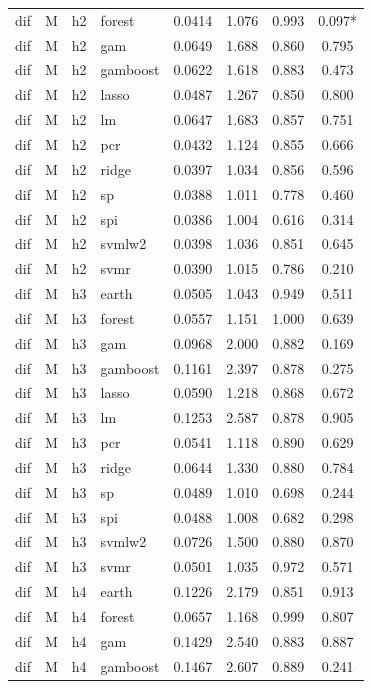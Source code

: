 \begin{ThreePartTable}
\begin{longtable}[t]{llclcccc}
dif & M & h2 & forest & 0.0414 & 1.076 & 0.993 & 0.097*\\
dif & M & h2 & gam & 0.0649 & 1.688 & 0.860 & 0.795\\
dif & M & h2 & gamboost & 0.0622 & 1.618 & 0.883 & 0.473\\
dif & M & h2 & lasso & 0.0487 & 1.267 & 0.850 & 0.800\\
dif & M & h2 & lm & 0.0647 & 1.683 & 0.857 & 0.751\\
dif & M & h2 & pcr & 0.0432 & 1.124 & 0.855 & 0.666\\
dif & M & h2 & ridge & 0.0397 & 1.034 & 0.856 & 0.596\\
dif & M & h2 & sp & 0.0388 & 1.011 & 0.778 & 0.460\\
dif & M & h2 & spi & 0.0386 & 1.004 & 0.616 & 0.314\\
dif & M & h2 & svmlw2 & 0.0398 & 1.036 & 0.851 & 0.645\\
dif & M & h2 & svmr & 0.0390 & 1.015 & 0.786 & 0.210\\
\addlinespace
dif & M & h3 & earth & 0.0505 & 1.043 & 0.949 & 0.511\\
dif & M & h3 & forest & 0.0557 & 1.151 & 1.000 & 0.639\\
dif & M & h3 & gam & 0.0968 & 2.000 & 0.882 & 0.169\\
dif & M & h3 & gamboost & 0.1161 & 2.397 & 0.878 & 0.275\\
dif & M & h3 & lasso & 0.0590 & 1.218 & 0.868 & 0.672\\
dif & M & h3 & lm & 0.1253 & 2.587 & 0.878 & 0.905\\
dif & M & h3 & pcr & 0.0541 & 1.118 & 0.890 & 0.629\\
dif & M & h3 & ridge & 0.0644 & 1.330 & 0.880 & 0.784\\
dif & M & h3 & sp & 0.0489 & 1.010 & 0.698 & 0.244\\
dif & M & h3 & spi & 0.0488 & 1.008 & 0.682 & 0.298\\
dif & M & h3 & svmlw2 & 0.0726 & 1.500 & 0.880 & 0.870\\
dif & M & h3 & svmr & 0.0501 & 1.035 & 0.972 & 0.571\\
\addlinespace
dif & M & h4 & earth & 0.1226 & 2.179 & 0.851 & 0.913\\
dif & M & h4 & forest & 0.0657 & 1.168 & 0.999 & 0.807\\
dif & M & h4 & gam & 0.1429 & 2.540 & 0.883 & 0.887\\
dif & M & h4 & gamboost & 0.1467 & 2.607 & 0.889 & 0.241\\

\end{longtable}
\end{ThreePartTable}
